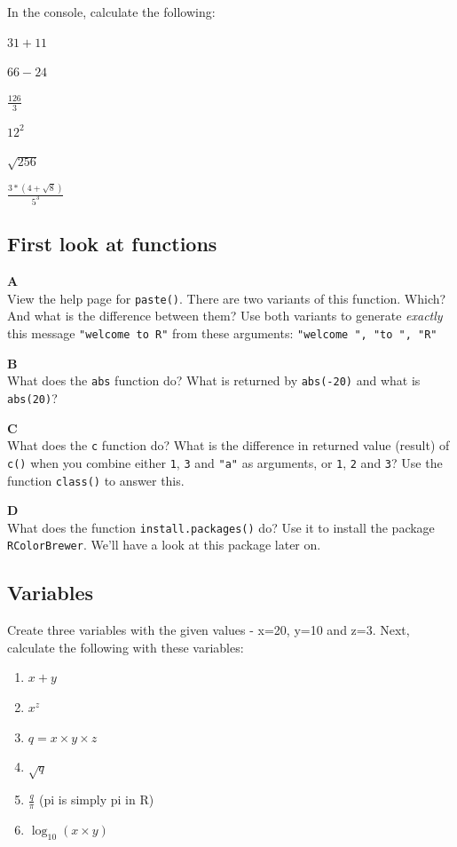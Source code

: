 \documentclass[]{book}
\providecommand{\tightlist}{%
  \setlength{\itemsep}{0pt}\setlength{\parskip}{0pt}}
\begin{document}
In the console, calculate the following:

\(31 + 11\)

\(66 - 24\)

\(\frac{126}{3}\)

\(12^2\)

\(\sqrt{256}\)

\(\frac{3*(4+\sqrt{8})}{5^3}\)

\hypertarget{first-look-at-functions}{%
\subsection{First look at functions}\label{first-look-at-functions}}

\textbf{A}\\
View the help page for \texttt{paste()}. There are two variants of this function. Which? And what is the difference between them? Use both variants to generate \emph{exactly} this message \texttt{"welcome\ to\ R"} from these arguments: \texttt{"welcome\ ",\ "to\ ",\ "R"}

\textbf{B}\\
What does the \texttt{abs} function do? What is returned by \texttt{abs(-20)} and what is \texttt{abs(20)}?

\textbf{C}\\
What does the \texttt{c} function do? What is the difference in returned value (result) of \texttt{c()} when you combine either \texttt{1}, \texttt{3} and \texttt{"a"} as arguments, or \texttt{1}, \texttt{2} and \texttt{3}? Use the function \texttt{class()} to answer this.

\textbf{D}\\
What does the function \texttt{install.packages()} do? Use it to install the package \texttt{RColorBrewer}. We'll have a look at this package later on.

\hypertarget{variables-1}{%
\subsection{Variables}\label{variables-1}}

Create three variables with the given values - x=20, y=10 and z=3. Next, calculate the following with these variables:

\begin{enumerate}
\def\labelenumi{\arabic{enumi}.}
\tightlist
\item
  \(x+y\)
\item
  \(x^z\)
\item
  \(q = x \times y \times z\)
\item
  \(\sqrt{q}\)
\item
  \(\frac{q}{\pi}\) (pi is simply pi in R)
\item
  \(\log_{10}{(x \times y)}\)
\end{enumerate}
\end{document}
